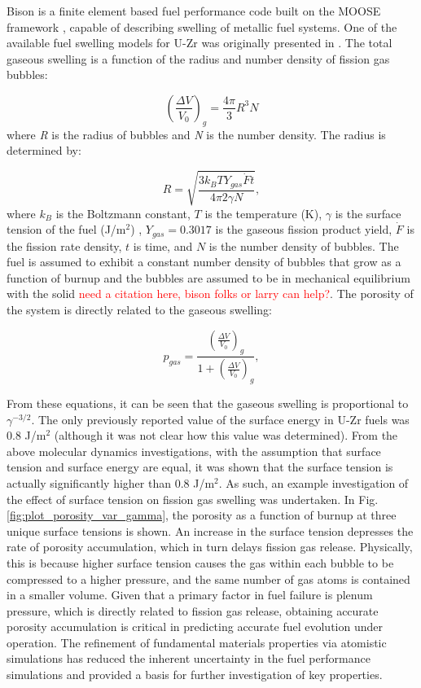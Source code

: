 \documentclass[review]{elsarticle}
\begin{document}
Bison is a finite element based fuel performance code built on the MOOSE framework \cite{tonks2017}, capable of describing swelling of metallic fuel systems. One of the available fuel swelling models for U-Zr was originally presented in \cite{olander76}. The total gaseous swelling is a function of the radius and number density of fission gas bubbles:

\begin{equation}
  \left(\frac{\Delta V}{V_0}\right)_{g}=\frac{4\pi}{3}R^3 N
  \label{eq:swelling}
\end{equation} where \textit{R} is the radius of bubbles and \textit{N} is the number density. The radius is determined by:

\begin{equation}
  \label{bubble_radius}
  R = \sqrt{\frac{3 k_B T Y_{gas} \dot{F} t}{4 \pi 2 \gamma N}},
\end{equation} where $k_B$ is the Boltzmann constant, $T$ is the temperature (K), $\gamma$ is the surface tension of the fuel (J/m$^2$) \cite{karahan2009}, $Y_{gas}=0.3017$ is the gaseous fission product yield, $\dot{F}$ is the fission rate density, $t$ is time, and $N$ is the number density of bubbles. The fuel is assumed to exhibit a constant number density of bubbles that grow as a function of burnup and the bubbles are assumed to be in mechanical equilibrium with the solid \cite{LLS_report} \textcolor{red}{need a citation here, bison folks or larry can help?}. The porosity of the system is directly related to the gaseous swelling: 

\begin{equation}
  p_{gas} = \frac{\left(\frac{\Delta V}{V_0}\right)_{g}}{1 + \left(\frac{\Delta V}{V_0}\right)_{g}},
\end{equation}

From these equations, it can be seen that the gaseous swelling is proportional to $\gamma^{-3/2}$. The only previously reported value of the surface energy in U-Zr fuels was 0.8 J/m$^2$ \cite{tsuboi1992} (although it was not clear how this value was determined). From the above molecular dynamics investigations, with the assumption that surface tension and surface energy are equal, it was shown that the surface tension is actually significantly higher than 0.8 J/m$^2$. As such, an example investigation of the effect of surface tension on fission gas swelling was undertaken. In Fig. \ref{fig:plot_porosity_var_gamma}, the porosity as a function of burnup at three unique surface tensions is shown. An increase in the surface tension depresses the rate of porosity accumulation, which in turn delays fission gas release. Physically, this is because higher surface tension causes the gas within each bubble to be compressed to a higher pressure, and the same number of gas atoms is contained in a smaller volume. Given that a primary factor in fuel failure is plenum pressure, which is directly related to fission gas release, obtaining accurate porosity accumulation is critical in predicting accurate fuel evolution under operation. The refinement of fundamental materials properties via atomistic simulations has reduced the inherent uncertainty in the fuel performance simulations and provided a basis for further investigation of key properties. 
\end{document}
